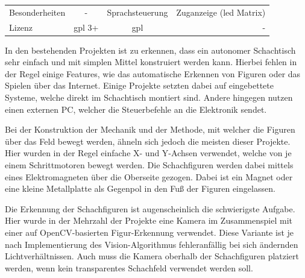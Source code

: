 \begin{longtable}[]{@{}lccr@{}}
\begin{minipage}[t]{0.19\columnwidth}
Besonderheiten\strut
\end{minipage} & \begin{minipage}[t]{0.25\columnwidth}\centering
-\strut
\end{minipage} & \begin{minipage}[t]{0.26\columnwidth}\centering
Sprachsteuerung\strut
\end{minipage} & \begin{minipage}[t]{0.19\columnwidth}\raggedleft
Zuganzeige (\gls{led} Matrix)\strut
\end{minipage}\tabularnewline
\begin{minipage}[t]{0.19\columnwidth}\raggedright
Lizenz\strut
\end{minipage} & \begin{minipage}[t]{0.25\columnwidth}\centering
\gls{gpl} 3+\strut
\end{minipage} & \begin{minipage}[t]{0.26\columnwidth}\centering
\gls{gpl}\strut
\end{minipage} & \begin{minipage}[t]{0.19\columnwidth}\raggedleft
-\strut
\end{minipage}\tabularnewline
\bottomrule
\end{longtable}

In den bestehenden Projekten ist zu erkennen, dass ein autonomer
Schachtisch sehr einfach und mit simplen Mittel konstruiert werden kann.
Hierbei fehlen in der Regel einige Features, wie das automatische
Erkennen von Figuren oder das Spielen über das Internet. Einige Projekte
setzten dabei auf eingebettete Systeme, welche direkt im Schachtisch
montiert sind. Andere hingegen nutzen einen externen PC, welcher die
Steuerbefehle an die Elektronik sendet.

Bei der Konstruktion der Mechanik und der Methode, mit welcher die
Figuren über das Feld bewegt werden, ähneln sich jedoch die meisten
dieser Projekte. Hier wurden in der Regel einfache X- und Y-Achsen
verwendet, welche von je einem Schrittmotoren bewegt werden. Die
Schachfiguren werden dabei mittels eines Elektromagneten über die
Oberseite gezogen. Dabei ist ein Magnet oder eine kleine Metallplatte
als Gegenpol in den Fuß der Figuren eingelassen.

Die Erkennung der Schachfiguren ist augenscheinlich die schwierigste
Aufgabe. Hier wurde in der Mehrzahl der Projekte eine Kamera im
Zusammenspiel mit einer auf OpenCV-basierten Figur-Erkennung verwendet.
Diese Variante ist je nach Implementierung des Vision-Algorithmus
fehleranfällig bei sich ändernden Lichtverhältnissen. Auch muss die
Kamera oberhalb der Schachfiguren platziert werden, wenn kein
transparentes Schachfeld verwendet werden soll.

